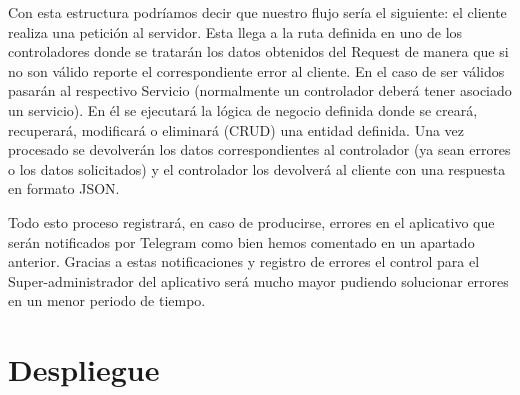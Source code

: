 Con esta estructura podríamos decir que nuestro flujo sería el siguiente: el cliente realiza una petición al servidor. Esta llega a la ruta definida en uno de los controladores donde se tratarán los datos obtenidos del Request de manera que si no son válido reporte el correspondiente error al cliente. En el caso de ser válidos pasarán al respectivo Servicio (normalmente un controlador deberá tener asociado un servicio). En él se ejecutará la lógica de negocio definida donde se creará, recuperará, modificará o eliminará (CRUD) una entidad definida. Una vez procesado se devolverán los datos correspondientes al controlador (ya sean errores o los datos solicitados) y el controlador los devolverá al cliente con una respuesta en formato JSON.

Todo esto proceso registrará, en caso de producirse, errores en el aplicativo que serán notificados por Telegram como bien hemos comentado en un apartado anterior. Gracias a estas notificaciones y registro de errores el control para el Super-administrador del aplicativo será mucho mayor pudiendo solucionar errores en un menor periodo de tiempo.

\section{Despliegue}

